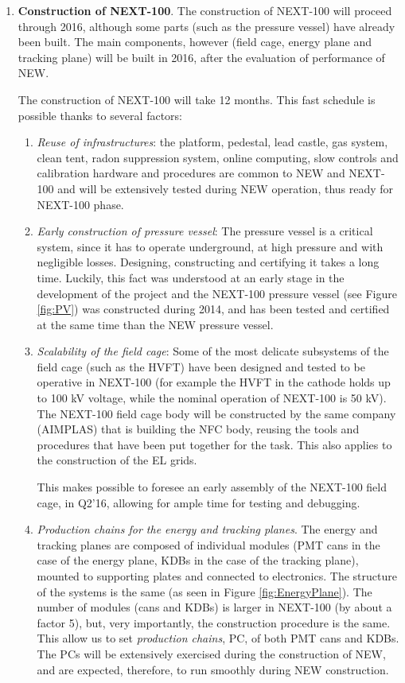 \begin{enumerate}
\item {\bf Construction of NEXT-100}. The construction of NEXT-100 will proceed through 2016, although some parts (such as the pressure vessel) have already been built. The main components, however (field cage, energy plane and tracking plane) will be built in 2016, after the evaluation of performance of NEW. 

The construction of NEXT-100 will take 12 months. This fast schedule is possible thanks to several factors:
\begin{enumerate}
\item {\em Reuse of infrastructures}: the platform, pedestal, lead castle, gas system, clean tent, radon suppression system, online computing, slow controls and calibration hardware and procedures are common to NEW and NEXT-100 and will be extensively tested during NEW operation, thus ready for NEXT-100 phase.
\item {\em Early construction of pressure vessel}: The pressure vessel is a critical system, since it has to operate underground, at high pressure and with negligible losses. Designing, constructing and certifying it takes a long time. Luckily, this fact was understood at an early stage in the development of the project and the NEXT-100 pressure vessel (see Figure \ref{fig:PV}) was constructed during 2014, and has been tested and certified at the same time than the NEW pressure vessel. 
\item {\em Scalability of the field cage}: Some of the most delicate subsystems of the field cage (such as the HVFT) have been designed and tested to be operative in NEXT-100 (for example the HVFT in the cathode holds up to 100 kV voltage, while the nominal operation of NEXT-100 is 50 kV). The NEXT-100 field cage body will be constructed by the same company (AIMPLAS) that is building the NFC body, reusing the tools and procedures that have been put together for the task. This also applies to the construction of the EL grids. 

This makes possible to foresee an early assembly of the NEXT-100 field cage, in Q2'16, allowing for ample time for testing and debugging.

\item {\em Production chains for the energy and tracking planes}. The energy and tracking planes are composed of individual modules (PMT cans in the case of the energy plane, KDBs in the case of the tracking plane), mounted to supporting plates and connected to electronics. The structure of the systems is the same (as seen in Figure \ref{fig:EnergyPlane}). The number of modules (cans and KDBs) is larger in NEXT-100 (by about a factor 5), but, very importantly, the construction procedure is the same. This allow us to set {\em production chains}, PC, of both PMT cans and KDBs. The PCs will be extensively exercised during the construction of NEW, and are expected, therefore, to run smoothly during NEW construction.  


\end{enumerate}
\end{enumerate}

